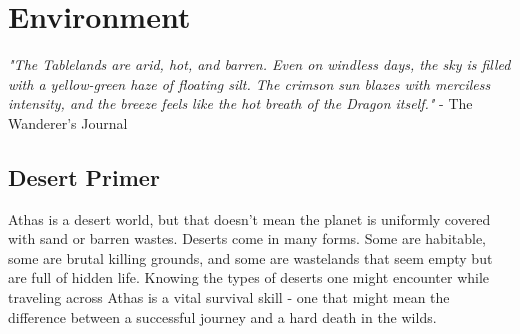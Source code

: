\section{Environment}\label{chap:environment}

\textit{"The Tablelands are arid, hot, and barren. Even on windless days,
the sky is filled with a yellow-green haze of floating silt. The crimson sun
blazes with merciless intensity, and the breeze feels like the hot breath of
the Dragon itself."} - The Wanderer’s Journal\\

\subsection{Desert Primer}
Athas is a desert world, but that doesn’t mean the planet is uniformly covered
with sand or barren wastes. Deserts come in many forms. Some are habitable,
some are brutal killing grounds, and some are wastelands that seem empty but
are full of hidden life. Knowing the types of deserts one might encounter
while traveling across Athas is a vital survival skill - one that might mean
the difference between a successful journey and a hard death in the wilds.

